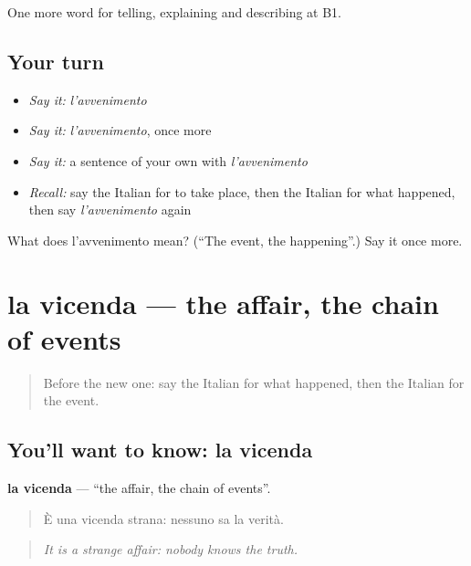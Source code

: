 \begin{grammarlens}[title={What you've built}]
One more word for telling, explaining and describing at B1.
\end{grammarlens}

\subsection*{Your turn}
\begin{itemize}
\raggedright
  \item \emph{Say it:} \emph{l'avvenimento}
  \item \emph{Say it:} \emph{l'avvenimento}, once more
  \item \emph{Say it:} a sentence of your own with \emph{l'avvenimento}
  \item \emph{Recall:} say the Italian for to take place, then the Italian for what happened, then say \emph{l'avvenimento} again
\end{itemize}

\begin{tcolorbox}[breakable,colback=teal!4,colframe=teal!35!black,title={Before you move on}]
What does l'avvenimento mean? (\textquotedblleft{}The event, the happening\textquotedblright{}.) Say it once more.
\end{tcolorbox}
\section[la vicenda]{la vicenda — the affair, the chain of events}

\label{lesson:IT-C276-vicenda}



\begin{quote}
Before the new one: say the Italian for what happened, then the Italian for the event.
\end{quote}

\subsection*{You'll want to know: la vicenda}
\textbf{la vicenda} — \textquotedblleft{}the affair, the chain of events\textquotedblright{}.

\begin{quote}
È una vicenda strana: nessuno sa la verità.
\end{quote}

\begin{quote}
\emph{It is a strange affair: nobody knows the truth.}
\end{quote}

